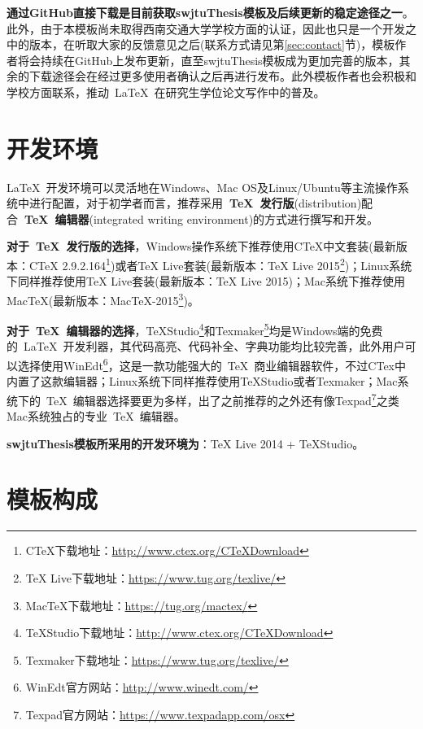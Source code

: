 \par
\textbf{通过GitHub直接下载是目前获取swjtuThesis模板及后续更新的稳定途径之一}。此外，由于本模板尚未取得西南交通大学学校方面的认证，因此也只是一个开发之中的版本，在听取大家的反馈意见之后(联系方式请见第\ref{sec:contact}节)，模板作者将会持续在GitHub上发布更新，直至swjtuThesis模板成为更加完善的版本，其余的下载途径会在经过更多使用者确认之后再进行发布。此外模板作者也会积极和学校方面联系，推动~\LaTeX{}~在研究生学位论文写作中的普及。

\section{开发环境}

\LaTeX{}~开发环境可以灵活地在Windows、Mac OS及Linux/Ubuntu等主流操作系统中进行配置，对于初学者而言，推荐采用\textbf{~\TeX~发行版}(distribution)配合\textbf{~\TeX~编辑器}(integrated writing environment)的方式进行撰写和开发。

\par
\textbf{对于~\TeX~发行版的选择}，Windows操作系统下推荐使用CTeX中文套装(最新版本：CTeX 2.9.2.164\footnote{CTeX下载地址：\url{http://www.ctex.org/CTeXDownload}})或者TeX Live套装(最新版本：TeX Live 2015\footnote{TeX Live下载地址：\url{https://www.tug.org/texlive/}})；Linux系统下同样推荐使用TeX Live套装(最新版本：TeX Live 2015)；Mac系统下推荐使用MacTeX(最新版本：MacTeX-2015\footnote{MacTeX下载地址：\url{https://tug.org/mactex/}})。

\par
\textbf{对于~\TeX~编辑器的选择}，TeXStudio\footnote{TeXStudio下载地址：\url{http://www.ctex.org/CTeXDownload}}和Texmaker\footnote{Texmaker下载地址：\url{https://www.tug.org/texlive/}}均是Windows端的免费的~\LaTeX{}~开发利器，其代码高亮、代码补全、字典功能均比较完善，此外用户可以选择使用WinEdt\footnote{WinEdt官方网站：\url{http://www.winedt.com/}}，这是一款功能强大的~\TeX~商业编辑器软件，不过CTex中内置了这款编辑器；Linux系统下同样推荐使用TeXStudio或者Texmaker；Mac系统下的~\TeX~编辑器选择要更为多样，出了之前推荐的之外还有像Texpad\footnote{Texpad官方网站：\url{https://www.texpadapp.com/osx}}之类Mac系统独占的专业~\TeX~编辑器。

\par
\textbf{swjtuThesis模板所采用的开发环境为}：TeX Live 2014 + TeXStudio。

\section{模板构成}

